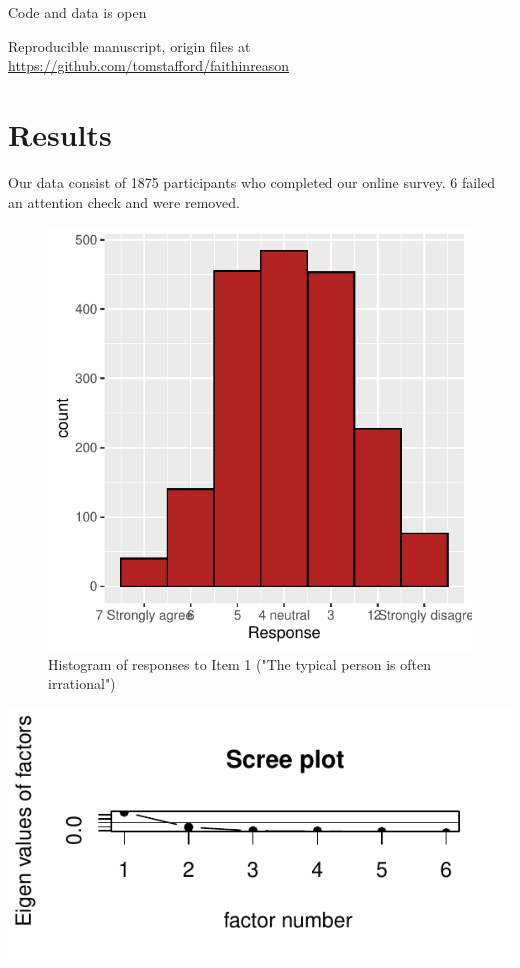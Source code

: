 \documentclass[
  ,jou,floatsintext]{apa6}
\begin{document}
Code and data is open

Reproducible manuscript, origin files at \url{https://github.com/tomstafford/faithinreason}

\hypertarget{results}{%
\section{Results}\label{results}}

Our data consist of 1875 participants who completed our online survey. 6 failed an attention check and were removed.

\begin{figure}

{\centering \includegraphics[width=0.75\linewidth]{faithinreason_files/figure-latex/ourhistogram-1} 

}

\caption{Histogram of responses to Item 1 ("The typical person is often irrational")}\label{fig:ourhistogram}
\end{figure}

\includegraphics{faithinreason_files/figure-latex/mokkenanalysis-1.pdf}
\end{document}

